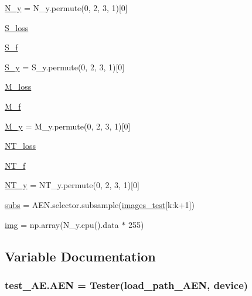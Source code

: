 \begin{DoxyCompactItemize}
\hyperlink{namespacetest___a_e_a67d37b10531bb1f019d9f59aff77b491}{N\+\_\+y} = N\+\_\+y.\+permute(0, 2, 3, 1)\mbox{[}0\mbox{]}
\item 
\hyperlink{namespacetest___a_e_ae14c86538ec827a806110649ffa666b9}{S\+\_\+loss}
\item 
\hyperlink{namespacetest___a_e_a29ce99f614666248891781c6a39cfb3b}{S\+\_\+f}
\item 
\hyperlink{namespacetest___a_e_a6ddb7593a8dca923d37640620839432d}{S\+\_\+y} = S\+\_\+y.\+permute(0, 2, 3, 1)\mbox{[}0\mbox{]}
\item 
\hyperlink{namespacetest___a_e_a15989f5822163e99fe46843f1056ebdb}{M\+\_\+loss}
\item 
\hyperlink{namespacetest___a_e_adf81b38c214c12b62a1137d8cd595d27}{M\+\_\+f}
\item 
\hyperlink{namespacetest___a_e_ae03a06a295031b4f2a3e658396ddaadd}{M\+\_\+y} = M\+\_\+y.\+permute(0, 2, 3, 1)\mbox{[}0\mbox{]}
\item 
\hyperlink{namespacetest___a_e_ab31f41095c9255a3c74b902f5d1e4885}{N\+T\+\_\+loss}
\item 
\hyperlink{namespacetest___a_e_af43c23f8d468df9b3e89f7371c371700}{N\+T\+\_\+f}
\item 
\hyperlink{namespacetest___a_e_a75955bdf3249638153debe3ba03ff6ee}{N\+T\+\_\+y} = N\+T\+\_\+y.\+permute(0, 2, 3, 1)\mbox{[}0\mbox{]}
\item 
\hyperlink{namespacetest___a_e_adab2099a4a8c25f911722a1641978ea8}{subs} = A\+E\+N.\+selector.\+subsample(\hyperlink{namespacetest___a_e_ad4d403402a170260faa8678ef573efa4}{images\+\_\+test}\mbox{[}k\+:k+1\mbox{]})
\item 
\hyperlink{namespacetest___a_e_a128dceb0115720115990ec4001397d18}{img} = np.\+array(N\+\_\+y.\+cpu().data $\ast$ 255)
\end{DoxyCompactItemize}


\subsection{Variable Documentation}
\subsubsection[{\texorpdfstring{A\+EN}{AEN}}]{\setlength{\rightskip}{0pt plus 5cm}test\+\_\+\+A\+E.\+A\+EN = {\bf Tester}({\bf load\+\_\+path\+\_\+\+A\+EN}, {\bf device})}\hypertarget{namespacetest___a_e_a8ccf165e86a8cc0d9f583dbfb1abfacb}{}\label{namespacetest___a_e_a8ccf165e86a8cc0d9f583dbfb1abfacb}
